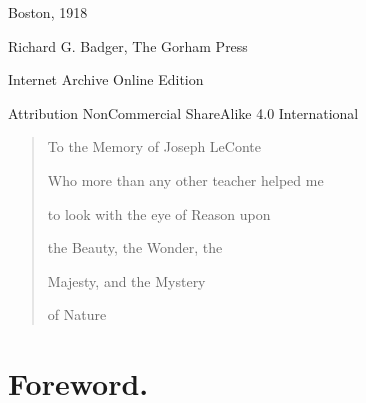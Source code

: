 \documentclass[a4paper, 11pt, oneside, polutonikogreek, english]{article}
\begin{document}
\begin{titlepage}
	
		
	\vspace*{\fill}%
	
	{Boston, 1918} %
 
        {\small Richard G. Badger, The Gorham Press}

	\vspace{1\baselineskip} %

        Internet Archive Online Edition  %
	
	{\small Attribution NonCommercial ShareAlike 4.0 International } %
\end{titlepage}
\clearpage
\pagestyle{fancy}
\fancyhf{}
\cfoot{\Fontauri{\thepage}}
\Large
\setlength{\parskip}{1mm plus1mm minus1mm}
\tableofcontents
\clearpage
\vspace*{\fill}
\begin{quotation}
\begin{center}
To the Memory of Joseph LeConte

Who more than any other teacher helped me

to look with the eye of Reason upon

the Beauty, the Wonder, the

Majesty, and the Mystery

of Nature
\end{center}
\end{quotation}
\vspace*{\fill}
\clearpage
\section*{Foreword.}
\end{document}
